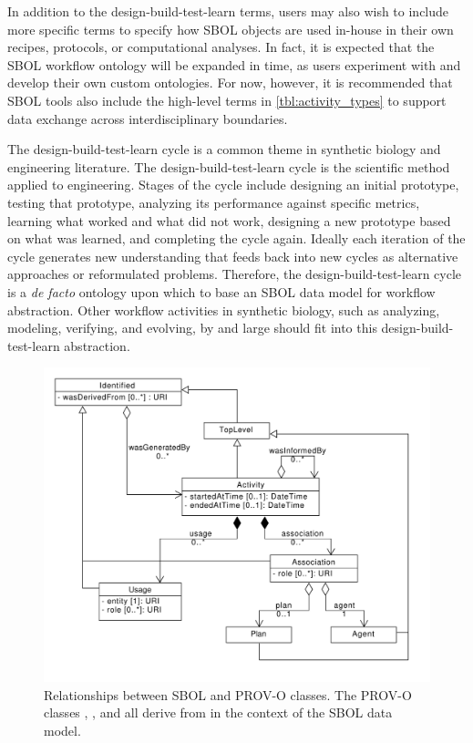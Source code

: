 In addition to the design-build-test-learn terms, users may also wish to include more specific terms to specify how SBOL objects are used in-house in their own recipes, protocols, or computational analyses. In fact, it is expected that the SBOL workflow ontology will be expanded in time, as users experiment with and develop their own custom ontologies. For now, however, it is recommended that SBOL tools also include the high-level terms in \ref{tbl:activity_types} to support data exchange across interdisciplinary boundaries.

The design-build-test-learn cycle is a common theme in synthetic biology and engineering literature. The design-build-test-learn cycle is the scientific method applied to engineering. Stages of the cycle include designing an initial prototype, testing that prototype, analyzing its performance against specific metrics, learning what worked and what did not work, designing a new prototype based on what was learned, and completing the cycle again. Ideally each iteration of the cycle generates new understanding that feeds back into new cycles as alternative approaches or reformulated problems. Therefore, the design-build-test-learn cycle is a \textit{de facto} ontology upon which to base an SBOL data model for workflow abstraction. Other workflow activities in synthetic biology, such as analyzing, modeling, verifying, and evolving, by and large should fit into this design-build-test-learn abstraction. 


\begin{figure}[ht]
\begin{center}
\includegraphics[scale=0.6]{uml/provenance}
\caption[]{Relationships between SBOL and PROV-O classes. The PROV-O classes , , and  all derive from  in the context of the SBOL data model.
\label{uml:provenance}}
\end{center}
\end{figure}

